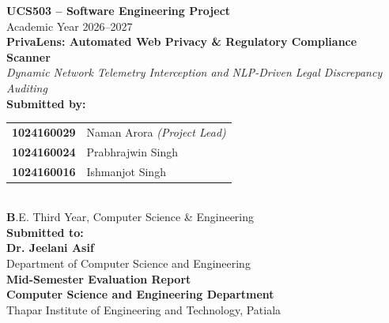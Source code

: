 \documentclass[12pt, a4paper, oneside]{report}
\begin{document}
\begin{titlepage}
    \centering
    \vspace*{0.5cm}
    
    {\Large\bfseries UCS503 -- Software Engineering Project}\\[0.3cm]
    {\large Academic Year 2026--2027}\\[1.5cm]
    
    {\Huge\bfseries PrivaLens: Automated Web Privacy \& Regulatory Compliance Scanner}\\[0.4cm]
    {\large\textit{Dynamic Network Telemetry Interception and NLP-Driven Legal Discrepancy Auditing}}\\[2.0cm]
    
    {\large\textbf{Submitted by:}}\\[0.3cm]
    \begin{tabular}{ll}
        \textbf{1024160029} & Naman Arora \textit{(Project Lead)} \\
        \textbf{1024160024} & Prabhrajwin Singh \\
        \textbf{1024160016} & Ishmanjot Singh \\
    \end{tabular}\\[0.5cm]
    {\normalsize\textbf B.E. Third Year, Computer Science \& Engineering}\\[1.6cm]
    
    {\large\textbf{Submitted to:}}\\[0.2cm]
    {\large\textbf{Dr. Jeelani Asif}}\\[0.1cm]
    {\normalsize Department of Computer Science and Engineering}\\[1.2cm]
    
    \vfill
    {\normalsize\textbf{Mid-Semester Evaluation Report}}\\[0.15cm]
    {\normalsize\textbf{Computer Science and Engineering Department}}\\[0.1cm]
    {\normalsize Thapar Institute of Engineering and Technology, Patiala}\\[0.4cm]
\end{titlepage}

\tableofcontents
\newpage
{}
\end{document}
